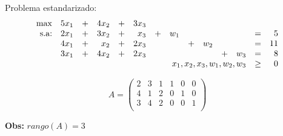 \documentclass[10pt, aspectratio=169]{beamer}
\begin{document}
    \begin{frame}
        Problema estandarizado:
        \vspace{0.1cm}
        \[
            \begin{array}{rrrrrrrrrrrrrr}
                \max & 5x_1 & + & 4x_2 & + & 3x_3 & \\
                \text{s.a:} & 2x_1 & + & 3x_2 & + & x_3  & + & w_1 &   &     &   &     & = & 5  \\
                & 4x_1 & + & x_2  & + & 2x_3 &   &     & + & w_2 &   &     & = & 11 \\
                & 3x_1 & + & 4x_2 & + & 2x_3 &   &     &   &     & + & w_3 & = & 8  \\
                & \multicolumn{11}{r}{x_1,x_2,x_3,w_1,w_2,w_3} & \geq & 0 \\
        \end{array}\]

        \[
            A = \begin{pmatrix}
                    2 & 3 & 1 & 1 & 0 & 0 \\
                    4 & 1 & 2 & 0 & 1 & 0 \\
                    3 & 4 & 2 & 0 & 0 & 1 \\
            \end{pmatrix}
        \]

        \textbf{Obs:} $rango(A)=3$
    \end{frame}
\end{document}
